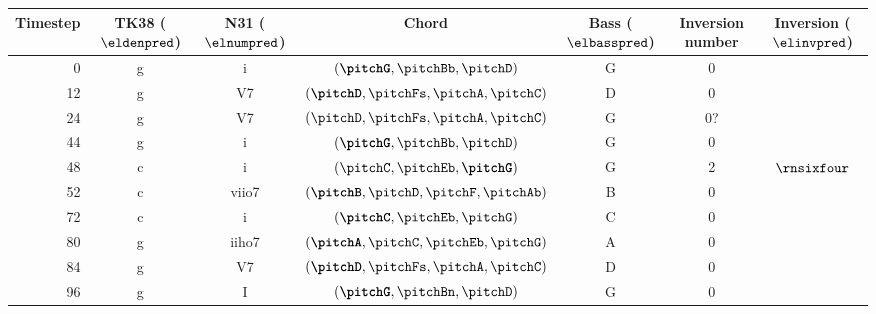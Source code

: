 \begin{tabular}{r|cccccc}
Timestep & TK38 ($\eldenpred$)     & N31 ($\elnumpred$) & Chord                                                      &  Bass ($\elbasspred$)   &  Inversion  number   & Inversion ($\elinvpred$)    \\ \hline
0        & g                       & i                  & $(\textbf{\pitchG}, \pitchBb, \pitchD)$                    &  G                      & 0                    &                              \\
12       & g                       & V7                 & $(\textbf{\pitchD}, \pitchFs, \pitchA, \pitchC)$           &  D                      & 0                    &                              \\
24       & g                       & V7                 & $(\pitchD, \pitchFs, \pitchA, \pitchC)$                    &  G                      & 0?                   &                               \\
44       & g                       & i                  & $(\textbf{\pitchG}, \pitchBb, \pitchD)$                    &  G                      & 0                    &                              \\ 
48       & c                       & i                  & $(\pitchC, \pitchEb, \textbf{\pitchG})$                    &  G                      & 2                    &   ${}\rnsixfour$                           \\
52       & c                       & viio7              & $(\textbf{\pitchB}, \pitchD, \pitchF, \pitchAb)$           &  B                      & 0                    &                              \\
72       & c                       & i                  & $(\textbf{\pitchC}, \pitchEb, \pitchG)$                    &  C                      & 0                    &                              \\
80       & g                       & iiho7              & $(\textbf{\pitchA}, \pitchC, \pitchEb, \pitchG)$           &  A                      & 0                    &                              \\
84       & g                       & V7                 & $(\textbf{\pitchD}, \pitchFs, \pitchA, \pitchC)$             &  D                    & 0                    &                              \\
96       & g                       & I                  & $(\textbf{\pitchG}, \pitchBn, \pitchD)$                      &  G                    & 0                    &                              \\
\end{tabular}
